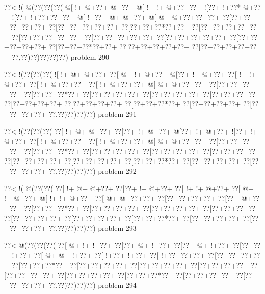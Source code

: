 \vbox{\vbox{\goo
\0??<\- !(\- @(\0??(\0??(\0??(
\- @[\- !+\- @+\0??+\- @+\0??+
\- @[\- !+\- !+\- @+\0??+\0??+
\- ![\0??+\- !+\0??*\- @+\0??+
\- ![\0??+\- !+\0??+\0??+\0??+
\- @[\- !+\0??+\- @+\- @+\0??+
\- @[\- @+\- @+\0??+\0??+\0??+
\0??[\0??+\0??+\0??+\0??+\0??+
\0??[\0??+\0??+\0??+\0??+\0??+
\0??[\0??+\0??+\0??*\0??+\0??+
\0??[\0??+\0??+\0??+\0??+\0??+
\0??[\0??+\0??+\0??+\0??+\0??+
\0??[\0??+\0??+\0??+\0??+\0??+
\0??[\0??+\0??+\0??+\0??+\0??+
\0??[\0??+\0??+\0??+\0??+\0??+
\0??[\0??+\0??+\0??*\0??+\0??+
\0??[\0??+\0??+\0??+\0??+\0??+
\0??[\0??+\0??+\0??+\0??+\0??+
\0??,\0??)\0??)\0??)\0??)\0??)
}
\hfil problem 290\hfil\break
}

\vbox{\vbox{\goo
\0??<\- !(\0??(\0??(\0??(
\- ![\- !+\- @+\- @+\0??+
\0??[\- @+\- !+\- @+\0??+
\- @[\0??+\- !+\- @+\0??+
\0??[\- !+\- !+\- @+\0??+
\0??[\- !+\- @+\0??+\0??+
\0??[\- !+\- @+\0??+\0??+
\- @[\- @+\- @+\0??+\0??+
\0??[\0??+\0??+\0??+\0??+
\0??[\0??+\0??+\0??*\0??+
\0??[\0??+\0??+\0??+\0??+
\0??[\0??+\0??+\0??+\0??+
\0??[\0??+\0??+\0??+\0??+
\0??[\0??+\0??+\0??+\0??+
\0??[\0??+\0??+\0??+\0??+
\0??[\0??+\0??+\0??*\0??+
\0??[\0??+\0??+\0??+\0??+
\0??[\0??+\0??+\0??+\0??+
\0??,\0??)\0??)\0??)\0??)
}
\hfil problem 291\hfil\break
}

\vbox{\vbox{\goo
\0??<\- !(\0??(\0??(\0??(
\0??[\- !+\- @+\- @+\0??+
\0??[\0??+\- !+\- @+\0??+
\- @[\0??+\- !+\- @+\0??+
\- ![\0??+\- !+\- @+\0??+
\0??[\- !+\- @+\0??+\0??+
\0??[\- !+\- @+\0??+\0??+
\- @[\- @+\- @+\0??+\0??+
\0??[\0??+\0??+\0??+\0??+
\0??[\0??+\0??+\0??*\0??+
\0??[\0??+\0??+\0??+\0??+
\0??[\0??+\0??+\0??+\0??+
\0??[\0??+\0??+\0??+\0??+
\0??[\0??+\0??+\0??+\0??+
\0??[\0??+\0??+\0??+\0??+
\0??[\0??+\0??+\0??*\0??+
\0??[\0??+\0??+\0??+\0??+
\0??[\0??+\0??+\0??+\0??+
\0??,\0??)\0??)\0??)\0??)
}
\hfil problem 292\hfil\break
}

\vbox{\vbox{\goo
\0??<\- !(\- @(\0??(\0??(
\0??[\- !+\- @+\- @+\0??+
\0??[\0??+\- !+\- @+\0??+
\0??[\- !+\- !+\- @+\0??+
\0??[\- @+\- !+\- @+\0??+
\- @[\- !+\- !+\- @+\0??+
\0??[\- @+\- @+\0??+\0??+
\0??[\0??+\0??+\0??+\0??+
\0??[\0??+\- @+\0??+\0??+
\0??[\0??+\0??+\0??*\0??+
\0??[\0??+\0??+\0??+\0??+
\0??[\0??+\0??+\0??+\0??+
\0??[\0??+\0??+\0??+\0??+
\0??[\0??+\0??+\0??+\0??+
\0??[\0??+\0??+\0??+\0??+
\0??[\0??+\0??+\0??*\0??+
\0??[\0??+\0??+\0??+\0??+
\0??[\0??+\0??+\0??+\0??+
\0??,\0??)\0??)\0??)\0??)
}
\hfil problem 293\hfil\break
}

\vbox{\vbox{\goo
\0??<\- @(\0??(\0??(\0??(
\0??[\- @+\- !+\- !+\0??+
\0??[\0??+\- @+\- !+\0??+
\0??[\0??+\- @+\- !+\0??+
\0??[\0??+\0??+\- !+\0??+
\0??[\- @+\- @+\- !+\0??+
\0??[\- !+\0??+\- !+\0??+
\0??[\- !+\0??+\0??+\0??+
\0??[\0??+\0??+\0??+\0??+
\0??[\0??+\0??+\0??*\0??+
\0??[\0??+\0??+\0??+\0??+
\0??[\0??+\0??+\0??+\0??+
\0??[\0??+\0??+\0??+\0??+
\0??[\0??+\0??+\0??+\0??+
\0??[\0??+\0??+\0??+\0??+
\0??[\0??+\0??+\0??*\0??+
\0??[\0??+\0??+\0??+\0??+
\0??[\0??+\0??+\0??+\0??+
\0??,\0??)\0??)\0??)\0??)
}
\hfil problem 294\hfil\break
}

